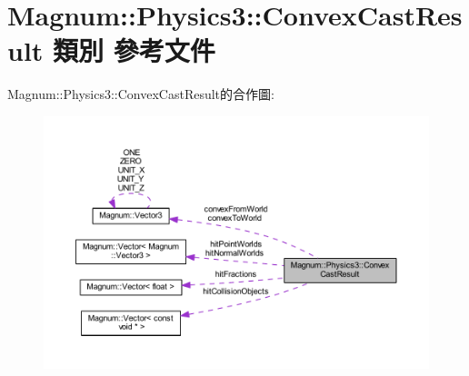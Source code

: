 \hypertarget{class_magnum_1_1_physics3_1_1_convex_cast_result}{}\section{Magnum\+:\+:Physics3\+:\+:Convex\+Cast\+Result 類別 參考文件}
\label{class_magnum_1_1_physics3_1_1_convex_cast_result}


Magnum\+:\+:Physics3\+:\+:Convex\+Cast\+Result的合作圖\+:\nopagebreak
\begin{figure}[H]
\begin{center}
\leavevmode
\includegraphics[width=350pt]{class_magnum_1_1_physics3_1_1_convex_cast_result__coll__graph}
\end{center}
\end{figure}
